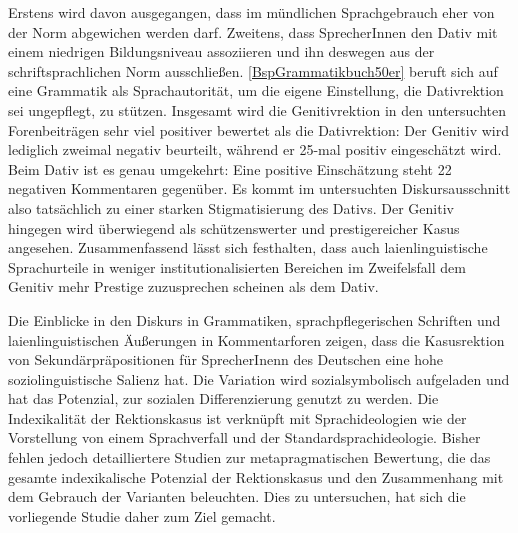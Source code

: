 Erstens wird davon ausgegangen, dass im mündlichen Sprachgebrauch eher von der Norm abgewichen werden darf. 
Zweitens, dass SprecherInnen den Dativ mit einem niedrigen Bildungsniveau assoziieren und ihn deswegen aus der schriftsprachlichen Norm ausschließen.
\autoref{BspGrammatikbuch50er} beruft sich auf eine Grammatik als Sprachautorität, um die eigene Einstellung, die Dativrektion sei \glqq ungepflegt\grqq, zu stützen. 
Insgesamt wird die Genitivrektion in den untersuchten Forenbeiträgen sehr viel positiver bewertet als die Dativrektion:
Der Genitiv wird lediglich zweimal negativ beurteilt, während er 25-mal positiv eingeschätzt wird. 
Beim Dativ ist es genau umgekehrt:
Eine positive Einschätzung steht 22 negativen Kommentaren gegenüber. 
Es kommt im untersuchten Diskursausschnitt also tatsächlich zu einer starken Stigmatisierung des Dativs. 
Der Genitiv hingegen wird überwiegend als schützenswerter und prestigereicher Kasus angesehen.
Zusammenfassend lässt sich festhalten, dass auch laienlinguistische Sprachurteile in weniger institutionalisierten Bereichen im Zweifelsfall dem Genitiv mehr Prestige zuzusprechen scheinen als dem Dativ.

Die Einblicke in den Diskurs in Grammatiken, sprachpflegerischen Schriften und laienlinguistischen Äußerungen in Kommentarforen zeigen, dass die Kasusrektion von Sekundärpräpositionen für SprecherInenn des Deutschen eine hohe soziolinguistische Salienz hat. 
Die Variation wird sozialsymbolisch aufgeladen und hat das Potenzial, zur sozialen Differenzierung genutzt zu werden. 
Die Indexikalität der Rektionskasus ist verknüpft mit Sprachideologien wie der Vorstellung von einem Sprachverfall und der Standardsprachideologie. 
Bisher fehlen jedoch detailliertere Studien zur metapragmatischen Bewertung, die das gesamte indexikalische Potenzial der Rektionskasus und den Zusammenhang mit dem Gebrauch der Varianten  beleuchten. 
Dies zu untersuchen, hat sich die vorliegende Studie daher zum Ziel gemacht. 
